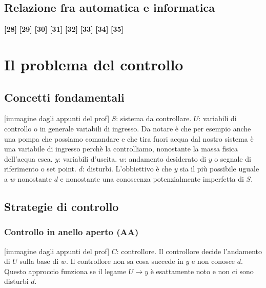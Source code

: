\subsection{Relazione fra automatica e informatica}
\textbf{[28]}\;
\newline\textbf{[29]}\;
\newline\textbf{[30]}\;
\newline\textbf{[31]}\;
\newline\textbf{[32]}\;
\newline\textbf{[33]}\;
\newline\textbf{[34]}\;
\newline\textbf{[35]}
\newpage
\section{Il problema del controllo}
\subsection{Concetti fondamentali}
[immagine dagli appunti del prof]\newline
$S$: sistema da controllare. \newline
$U$: variabili di controllo o in generale variabili di ingresso. Da notare è che per esempio anche una pompa che possiamo comandare e che tira fuori acqua dal nostro sistema è una variabile di ingresso perchè la controlliamo, nonostante la massa fisica dell'acqua esca.
$y$: variabili d'uscita.\newline
$w$: andamento desiderato di $y$ o segnale di riferimento o set point.\newline
$d$: disturbi.\newline
L'obbiettivo è che $y$ sia il più possibile uguale a $w$ nonostante $d$ e nonostante una conoscenza potenzialmente imperfetta di $S$.
\subsection{Strategie di controllo}
\subsubsection{Controllo in anello aperto (AA)}
[immagine dagli appunti del prof]\newline
$C$: controllore.\newline
Il controllore decide l'andamento di $U$ sulla base di $w$. Il controllore non sa cosa succede in $y$ e non conosce $d$.\newline
Questo approccio funziona se il legame $U \rightarrow y$ è esattamente noto e non ci sono disturbi $d$.\newline

